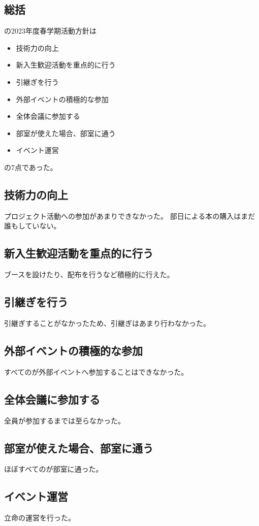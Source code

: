 \subsection*{\secondGrade{}総括}


\secondGrade{}の2023年度春学期活動方針は
\begin{itemize}
    \item 技術力の向上
    \item 新入生歓迎活動を重点的に行う
    \item 引継ぎを行う
    \item 外部イベントの積極的な参加
    \item 全体会議に参加する
    \item 部室が使えた場合、部室に通う
    \item イベント運営
\end{itemize}
の7点であった。

\subsection{技術力の向上}
プロジェクト活動への参加があまりできなかった。
部日による本の購入はまだ誰もしていない。

\subsection{新入生歓迎活動を重点的に行う}
ブースを設けたり、配布を行うなど積極的に行えた。

\subsection{引継ぎを行う}
引継ぎすることがなかったため、引継ぎはあまり行わなかった。

\subsection{外部イベントの積極的な参加}
すべての\secondGrade{}が外部イベントへ参加することはできなかった。

\subsection{全体会議に参加する}
全員が参加するまでは至らなかった。

\subsection{部室が使えた場合、部室に通う}
ほぼすべての\secondGrade{}が部室に通った。

\subsection{イベント運営}
立命の運営を行った。